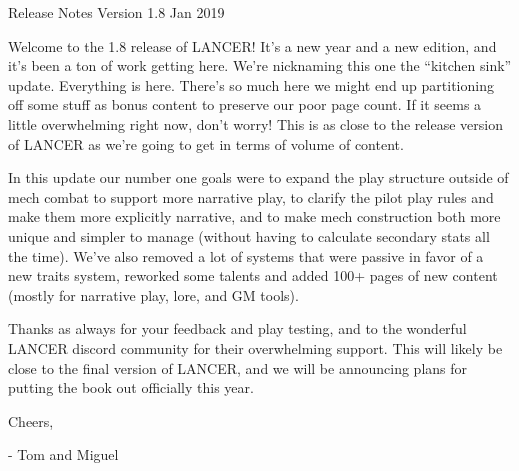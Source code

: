 Release Notes
Version 1.8
Jan 2019

Welcome to the 1.8 release of LANCER! It’s a new year and a new edition, and it’s been a ton of
work getting here. We’re nicknaming this one the ``kitchen sink'' update. Everything is here. There’s
so much here we might end up partitioning off some stuff as bonus content to preserve our poor
page count. If it seems a little overwhelming right now, don’t worry! This is as close to the release
version of LANCER as we’re going to get in terms of volume of content.

In this update our number one goals were to expand the play structure outside of mech combat to
support more narrative play, to clarify the pilot play rules and make them more explicitly narrative,
and to make mech construction both more unique and simpler to manage (without having to
calculate secondary stats all the time). We’ve also removed a lot of systems that were passive in
favor of a new traits system, reworked some talents and added 100+ pages of new content
(mostly for narrative play, lore, and GM tools).

Thanks as always for your feedback and play testing, and to the wonderful LANCER discord
community for their overwhelming support. This will likely be close to the final version of LANCER,
and we will be announcing plans for putting the book out officially this year.

Cheers,

- Tom and Miguel








